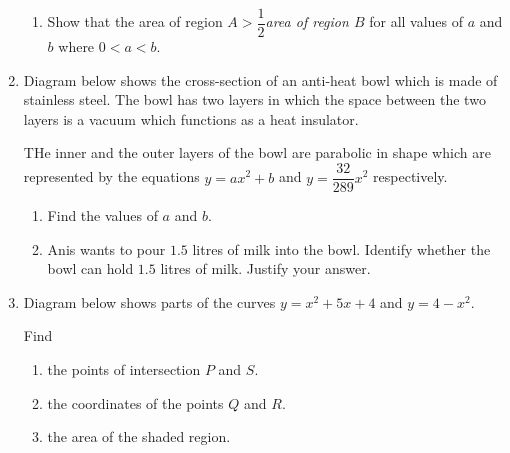 \documentclass{report}
\begin{document}
\begin{multicols*}{2}
\begin{enumerate}
\begin{enumerate}
                        \item Show that the area of region $A > \dfrac{1}{2}$\textit{area of region $B$} for
                              all values of $a$ and $b$ where $0 < a < b$.
                  \end{enumerate}

            \item Diagram below shows the cross-section of an anti-heat bowl which is made of
                  stainless steel. The bowl has two layers in which the space between the two
                  layers is a vacuum which functions as a heat insulator.

                  THe inner and the outer layers of the bowl are parabolic in shape which are
                  represented by the equations $y = ax^2 + b$ and $y = \dfrac{32}{289}x^2$
                  respectively.
                  \begin{enumerate}
                        \item Find the values of $a$ and $b$.

                        \item Anis wants to pour $1.5$ litres of milk into the bowl. Identify whether the
                              bowl can hold $1.5$ litres of milk. Justify your answer.
                  \end{enumerate}

            \item Diagram below shows parts of the curves $y = x^2 + 5x + 4$ and $y = 4 - x^2$.

                  Find
                  \begin{enumerate}
                        \item the points of intersection $P$ and $S$.

                        \item the coordinates of the points $Q$ and $R$.

                        \item the area of the shaded region.
                  \end{enumerate}
      \end{enumerate}
\end{multicols*}
\end{document}
